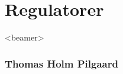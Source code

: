 
\section{Regulatorer}
\begin{frame}<beamer>
\frametitle{Thomas Holm Pilgaard}
\tableofcontents[currentsection]
\end{frame}













